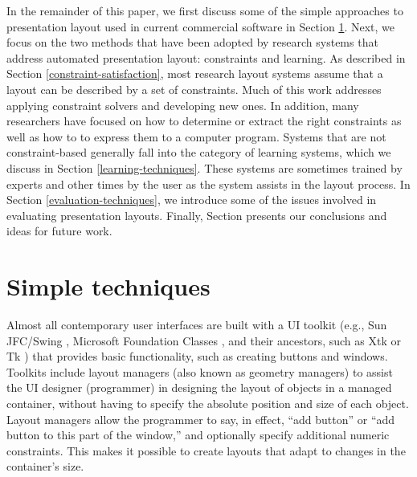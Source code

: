 
		In the remainder of this paper, we first discuss some of the simple
		approaches to presentation layout used in current commercial software in
		Section \ref{simple-techniques}. Next, we focus on the two methods that
		have been adopted by research systems that address automated presentation
		layout: constraints and learning. As described in Section
		\ref{constraint-satisfaction}, most research layout systems assume that a
		layout can be described by a set of constraints. Much of this work
		addresses applying constraint solvers and developing new ones. In addition,
		many researchers have focused on how to determine or extract the right
		constraints as well as how to to express them to a computer program.
		Systems that are not constraint-based generally fall into the category of
		learning systems, which we discuss in Section \ref{learning-techniques}.
		These systems are sometimes trained by experts and other times by the user
		as the system assists in the layout process. In Section
		\ref{evaluation-techniques}, we introduce some of the issues involved in
		evaluating presentation layouts. Finally, Section
		\label{conclusions-layout-paper} presents our conclusions and ideas for
		future work.

		\section{Simple techniques}
		\label{simple-techniques}

		Almost all contemporary user interfaces are built with a UI toolkit (e.g.,
		Sun JFC/Swing \citep{sun-1}, Microsoft Foundation Classes
		\citep{microsoft-1}, and their ancestors, such as Xtk \citep{mccormack-1}
		or Tk \citep{ousterhout-1}) that provides basic functionality, such as
		creating buttons and windows. Toolkits include layout managers (also known
		as geometry managers) to assist the UI designer (programmer) in designing
		the layout of objects in a managed container, without having to specify the
		absolute position and size of each object. Layout managers allow the
		programmer to say, in effect, “add button” or “add button to this part of
		the window,” and optionally specify additional numeric constraints. This
		makes it possible to create layouts that adapt to changes in the
		container’s size.

